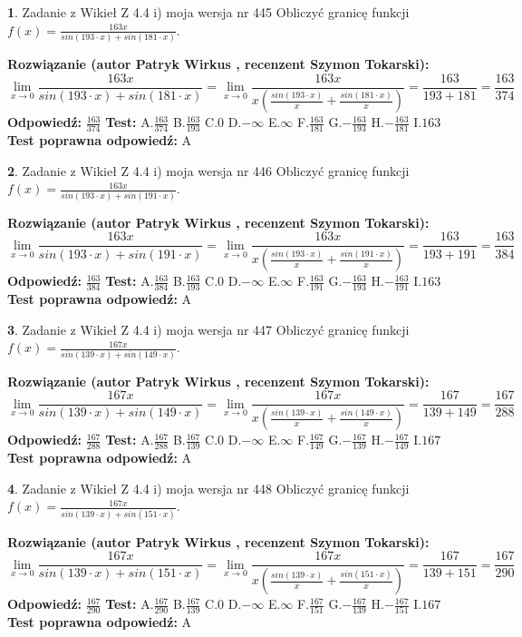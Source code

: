 \documentclass[12pt, a4paper]{article}
\theoremstyle{definition} %
\newtheorem{zad}{}
\newcommand{\zadStart}[1]{\begin{zad}#1\newline}
\newcommand{\zadStop}{\end{zad}}
\newcommand{\rozwStart}[2]{\noindent \textbf{Rozwiązanie (autor #1 , recenzent #2): }\newline}
\newcommand{\rozwStop}{\newline}
\newcommand{\odpStart}{\noindent \textbf{Odpowiedź:}\newline}
\newcommand{\odpStop}{\newline}
\newcommand{\testStart}{\noindent \textbf{Test:}\newline}
\newcommand{\testStop}{\newline}
\newcommand{\kluczStart}{\noindent \textbf{Test poprawna odpowiedź:}\newline}
\newcommand{\kluczStop}{\newline}
\begin{document}
\zadStart{Zadanie z Wikieł Z 4.4 i) moja wersja nr 445}
Obliczyć granicę funkcji $f(x)=\frac{163x}{sin(193\cdot x) +sin(181\cdot x)}$.
\zadStop
\rozwStart{Patryk Wirkus}{Szymon Tokarski}
$$\lim\limits_{x\to 0}\frac{163x}{sin(193\cdot x) +sin(181\cdot x)}=\lim\limits_{x\to 0}\frac{163x}{x(\frac{sin(193\cdot x)}{x}+\frac{sin(181\cdot x)}{x})}=\frac{163}{193+181} = \frac{163}{374}$$
\rozwStop
\odpStart
$\frac{163}{374}$
\odpStop
\testStart
A.$\frac{163}{374}$
B.$\frac{163}{193}$
C.$0$
D.$-\infty$
E.$\infty$
F.$\frac{163}{181}$
G.$-\frac{163}{193}$
H.$-\frac{163}{181}$
I.$163$
\testStop
\kluczStart
A
\kluczStop



\zadStart{Zadanie z Wikieł Z 4.4 i) moja wersja nr 446}
Obliczyć granicę funkcji $f(x)=\frac{163x}{sin(193\cdot x) +sin(191\cdot x)}$.
\zadStop
\rozwStart{Patryk Wirkus}{Szymon Tokarski}
$$\lim\limits_{x\to 0}\frac{163x}{sin(193\cdot x) +sin(191\cdot x)}=\lim\limits_{x\to 0}\frac{163x}{x(\frac{sin(193\cdot x)}{x}+\frac{sin(191\cdot x)}{x})}=\frac{163}{193+191} = \frac{163}{384}$$
\rozwStop
\odpStart
$\frac{163}{384}$
\odpStop
\testStart
A.$\frac{163}{384}$
B.$\frac{163}{193}$
C.$0$
D.$-\infty$
E.$\infty$
F.$\frac{163}{191}$
G.$-\frac{163}{193}$
H.$-\frac{163}{191}$
I.$163$
\testStop
\kluczStart
A
\kluczStop



\zadStart{Zadanie z Wikieł Z 4.4 i) moja wersja nr 447}
Obliczyć granicę funkcji $f(x)=\frac{167x}{sin(139\cdot x) +sin(149\cdot x)}$.
\zadStop
\rozwStart{Patryk Wirkus}{Szymon Tokarski}
$$\lim\limits_{x\to 0}\frac{167x}{sin(139\cdot x) +sin(149\cdot x)}=\lim\limits_{x\to 0}\frac{167x}{x(\frac{sin(139\cdot x)}{x}+\frac{sin(149\cdot x)}{x})}=\frac{167}{139+149} = \frac{167}{288}$$
\rozwStop
\odpStart
$\frac{167}{288}$
\odpStop
\testStart
A.$\frac{167}{288}$
B.$\frac{167}{139}$
C.$0$
D.$-\infty$
E.$\infty$
F.$\frac{167}{149}$
G.$-\frac{167}{139}$
H.$-\frac{167}{149}$
I.$167$
\testStop
\kluczStart
A
\kluczStop



\zadStart{Zadanie z Wikieł Z 4.4 i) moja wersja nr 448}
Obliczyć granicę funkcji $f(x)=\frac{167x}{sin(139\cdot x) +sin(151\cdot x)}$.
\zadStop
\rozwStart{Patryk Wirkus}{Szymon Tokarski}
$$\lim\limits_{x\to 0}\frac{167x}{sin(139\cdot x) +sin(151\cdot x)}=\lim\limits_{x\to 0}\frac{167x}{x(\frac{sin(139\cdot x)}{x}+\frac{sin(151\cdot x)}{x})}=\frac{167}{139+151} = \frac{167}{290}$$
\rozwStop
\odpStart
$\frac{167}{290}$
\odpStop
\testStart
A.$\frac{167}{290}$
B.$\frac{167}{139}$
C.$0$
D.$-\infty$
E.$\infty$
F.$\frac{167}{151}$
G.$-\frac{167}{139}$
H.$-\frac{167}{151}$
I.$167$
\testStop
\kluczStart
A
\kluczStop
\end{document}

